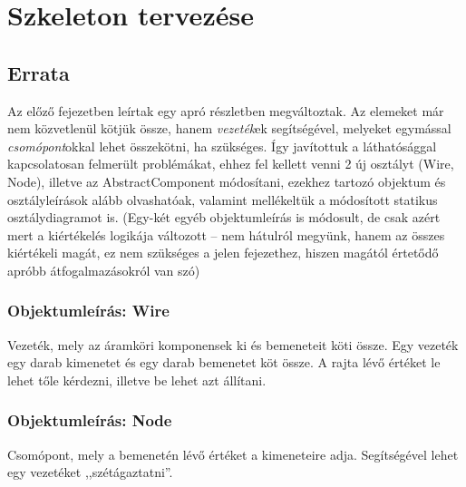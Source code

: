 %


\newcommand{\breaktable}{%
 \setcounter{enumi_saved}{\value{enumi}}
 \end{itemize}\end{itemize}\\
 \begin{itemize}\begin{itemize}
 \setcounter{enumi}{\value{enumi_saved}}
}

\chapter{Szkeleton tervezése}

\thispagestyle{fancy}

\section{Errata}

Az előző fejezetben leírtak egy apró részletben megváltoztak. Az elemeket már nem közvetlenül kötjük össze, hanem \textit{vezeték}ek segítségével, melyeket egymással \textit{csomópont}okkal lehet összekötni, ha szükséges. Így javítottuk a láthatósággal kapcsolatosan felmerült problémákat, ehhez fel kellett venni 2 új osztályt (Wire, Node), illetve az AbstractComponent módosítani, ezekhez tartozó objektum és osztályleírások alább olvashatóak, valamint mellékeltük a módosított statikus osztálydiagramot is. (Egy-két egyéb objektumleírás is módosult, de csak azért mert a kiértékelés logikája változott -- nem hátulról megyünk, hanem az összes kiértékeli magát, ez nem szükséges a jelen fejezethez, hiszen magától értetődő apróbb átfogalmazásokról van szó)

\subsection{Objektumleírás: \bf Wire}
Vezeték, mely az áramköri komponensek ki és bemeneteit köti össze. Egy vezeték egy darab kimenetet és egy darab bemenetet köt össze. A rajta lévő értéket le lehet tőle kérdezni, illetve be lehet azt állítani.

\subsection{Objektumleírás: \bf Node}
Csomópont, mely a bemenetén lévő értéket a kimeneteire adja. Segítségével lehet egy vezetéket ,,szétágaztatni''.

